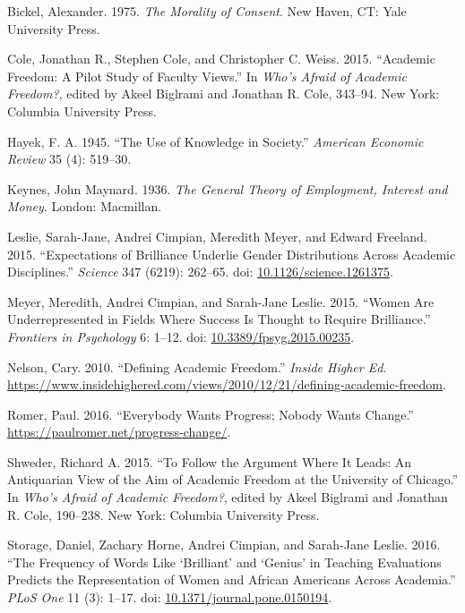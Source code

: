 \documentclass[
  11pt,
  letterpaper,
  DIV=11,
  numbers=noendperiod,
  twoside]{scrartcl}
\newlength{\cslhangindent}
\newenvironment{CSLReferences}[2] %
 {\begin{list}{}{%
  \setlength{\itemindent}{0pt}
  \setlength{\leftmargin}{0pt}
  \setlength{\parsep}{0pt}
  \ifodd #1
   \setlength{\leftmargin}{\cslhangindent}
   \setlength{\itemindent}{-1\cslhangindent}
  \fi
  \setlength{\itemsep}{#2\baselineskip}}}
 {\end{list}}
\begin{document}
\label{refs}
\begin{CSLReferences}{1}{0}
Bickel, Alexander. 1975. \emph{The Morality of Consent}. New Haven, CT:
Yale University Press.

Cole, Jonathan R., Stephen Cole, and Christopher C. Weiss. 2015.
{``Academic Freedom: A Pilot Study of Faculty Views.''} In \emph{Who's
Afraid of Academic Freedom?}, edited by Akeel Biglrami and Jonathan R.
Cole, 343--94. New York: Columbia University Press.

Hayek, F. A. 1945. {``The Use of Knowledge in Society.''} \emph{American
Economic Review} 35 (4): 519--30.

Keynes, John Maynard. 1936. \emph{The General Theory of Employment,
Interest and Money}. London: Macmillan.

Leslie, Sarah-Jane, Andrei Cimpian, Meredith Meyer, and Edward Freeland.
2015. {``Expectations of Brilliance Underlie Gender Distributions Across
Academic Disciplines.''} \emph{Science} 347 (6219): 262--65. doi:
\href{https://doi.org/10.1126/science.1261375}{10.1126/science.1261375}.

Meyer, Meredith, Andrei Cimpian, and Sarah-Jane Leslie. 2015. {``Women
Are Underrepresented in Fields Where Success Is Thought to Require
Brilliance.''} \emph{Frontiers in Psychology} 6: 1--12. doi:
\href{https://doi.org/10.3389/fpsyg.2015.00235}{10.3389/fpsyg.2015.00235}.

Nelson, Cary. 2010. {``Defining Academic Freedom.''} \emph{Inside Higher
Ed}.
\url{https://www.insidehighered.com/views/2010/12/21/defining-academic-freedom}.

Romer, Paul. 2016. {``Everybody Wants Progress; Nobody Wants Change.''}
\url{https://paulromer.net/progress-change/}.

Shweder, Richard A. 2015. {``To Follow the Argument Where It Leads: An
Antiquarian View of the Aim of Academic Freedom at the University of
Chicago.''} In \emph{Who's Afraid of Academic Freedom?}, edited by Akeel
Biglrami and Jonathan R. Cole, 190--238. New York: Columbia University
Press.

Storage, Daniel, Zachary Horne, Andrei Cimpian, and Sarah-Jane Leslie.
2016. {``The Frequency of Words Like {`Brilliant'} and {`Genius'} in
Teaching Evaluations Predicts the Representation of Women and African
Americans Across Academia.''} \emph{PLoS One} 11 (3): 1--17. doi:
\href{https://doi.org/10.1371/journal.pone.0150194}{10.1371/journal.pone.0150194}.


\end{CSLReferences}
\end{document}

